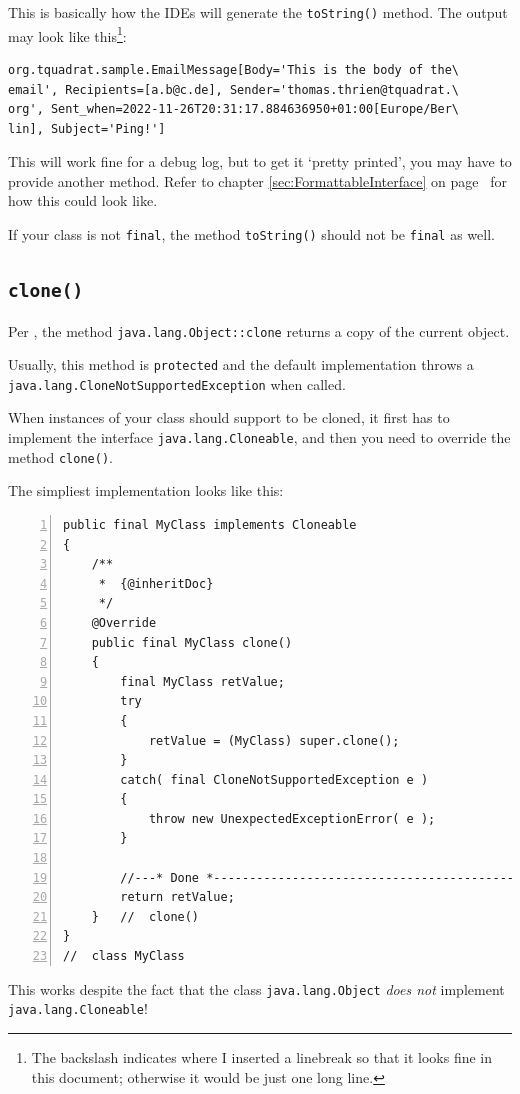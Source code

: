 \documentclass[11pt,a4paper, titlepage, parskip=half, headsepline, footsepline, cleardoublepage=current, headheight=1cm]{scrbook}
\newcommand*{\tqvref}[1]{\hyperref[{#1}]{\ref*{#1}} on page~\pageref{#1}}
\begin{document}
This is basically how the IDEs will generate the \lstinline|toString()| method. The output may look like this\footnote{The backslash indicates where I inserted a linebreak so that it looks fine in this document; otherwise it would be just one long line.}:
\begin{verbatim}
org.tquadrat.sample.EmailMessage[Body='This is the body of the\
email', Recipients=[a.b@c.de], Sender='thomas.thrien@tquadrat.\
org', Sent_when=2022-11-26T20:31:17.884636950+01:00[Europe/Ber\
lin], Subject='Ping!']
\end{verbatim}

This will work fine for a debug log, but to get it ‘pretty printed’, you may have to provide another method. Refer to chapter \tqvref{sec:FormattableInterface} for how
this could look like.

If your class is not \lstinline|final|, the method \lstinline|toString()| should not be \lstinline|final| as well. 

\subsection{\lstinline|clone()|}\label{sec:Clone}
Per \autocite{ORACLE_DOC_OBJECT:clone}, the method \lstinline|java.lang.Object::clone| returns a copy of the current object.

Usually, this method is \lstinline|protected| and the default implementation throws a \lstinline|java.lang.CloneNotSupportedException|\autocite{ORACLE_DOC_CLONENOTSUPPORTEDEXCEPTION_CLASS} when called.

When instances of your class should support to be cloned, it first has to implement the interface \lstinline|java.lang.Cloneable|\autocite{ORACLE_DOC_CLONEABLE_INTERFACE}, and then you need to override the method \lstinline|clone()|.

The simpliest implementation looks like this:
\begin{lstlisting}[numbers=left,caption={A simple clone() Method}]
public final MyClass implements Cloneable
{
    /**
     *  {@inheritDoc}
     */
    @Override
    public final MyClass clone()
    {
        final MyClass retValue;
        try
        {
            retValue = (MyClass) super.clone();
        }    
        catch( final CloneNotSupportedException e )
        {
            throw new UnexpectedExceptionError( e );
        }
        
        //---* Done *------------------------------------------------
        return retValue;
    }   //  clone() 
}
//  class MyClass
\end{lstlisting}
This works despite the fact that the class \lstinline|java.lang.Object| \textit{does not} implement \lstinline|java.lang.Cloneable|!
\end{document}
